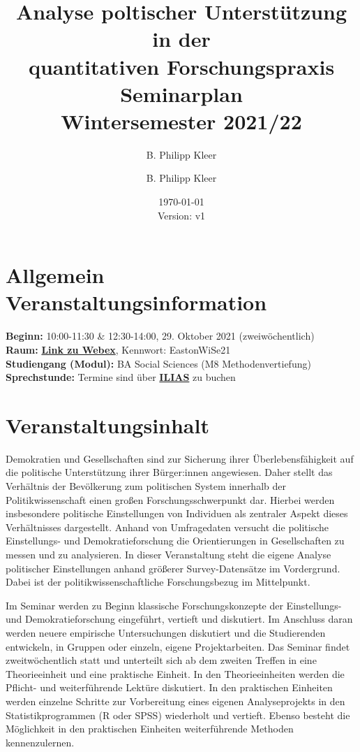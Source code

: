 \documentclass[11pt,a4paper]{article}
\author{B. Philipp Kleer}
\title{%
  Analyse poltischer Unterstützung in der\\quantitativen Forschungspraxis \\
  \large Seminarplan \\
  Wintersemester 2021/22}
\author{B. Philipp Kleer}
\date{\today \\ \small{Version: v1}}
\begin{document}
\maketitle

\section*{Allgemein Veranstaltungsinformation}
\textbf{Beginn:} 10:00-11:30 \& 12:30-14:00, 29. Oktober 2021 (zweiwöchentlich) \\
\textbf{Raum:} \href{https://uni-giessen.webex.com/uni-giessen/j.php?MTID=me9b9e8587ea9a3c966be53ea4b36f4f1}{\textbf{Link zu Webex}}, Kennwort: EastonWiSe21  \\
\textbf{Studiengang (Modul):} BA Social Sciences (M8 Methodenvertiefung)\\
\textbf{Sprechstunde:} Termine sind über \href{https://ilias.uni-giessen.de/ilias/goto.php?target=prtf_415969_35654&client_id=JLUG}{\textbf{ILIAS}} zu buchen

\section*{Veranstaltungsinhalt}

Demokratien und Gesellschaften sind zur Sicherung ihrer Überlebensfähigkeit auf die politische Unterstützung ihrer Bürger:innen angewiesen. Daher stellt das Verhältnis der Bevölkerung zum politischen System innerhalb der Politikwissenschaft einen großen Forschungsschwerpunkt dar. Hierbei werden insbesondere politische Einstellungen von Individuen als zentraler Aspekt dieses Verhältnisses dargestellt. Anhand von Umfragedaten versucht die politische Einstellungs- und Demokratieforschung die Orientierungen in Gesellschaften zu messen und zu analysieren. In dieser Veranstaltung steht die eigene Analyse politischer Einstellungen anhand größerer Survey-Datensätze im Vordergrund. Dabei ist der politikwissenschaftliche Forschungsbezug im Mittelpunkt. 

Im Seminar werden zu Beginn klassische Forschungskonzepte der Einstellungs- und Demokratieforschung eingeführt, vertieft und diskutiert. Im Anschluss daran werden neuere empirische Untersuchungen diskutiert und die Studierenden entwickeln, in Gruppen oder einzeln, eigene Projektarbeiten. Das Seminar findet zweitwöchentlich statt und unterteilt sich ab dem zweiten Treffen in eine Theorieeinheit und eine praktische Einheit. In den Theorieeinheiten werden die Pflicht- und weiterführende Lektüre diskutiert. In den praktischen Einheiten werden einzelne Schritte zur Vorbereitung eines eigenen Analyseprojekts in den Statistikprogrammen (R oder SPSS) wiederholt und vertieft. Ebenso besteht die Möglichkeit in den praktischen Einheiten weiterführende Methoden kennenzulernen.
\end{document}
